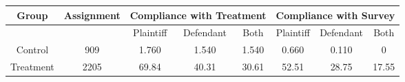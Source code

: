 \begin{tabular}{cccccccc} 
\toprule
\multicolumn{1}{c}{Group}  & \multicolumn{1}{c}{Assignment}  & \multicolumn{3}{c}{Compliance with Treatment}  & \multicolumn{3}{c}{Compliance with Survey}  \\
\midrule
\midrule
&   & Plaintiff & Defendant & Both & Plaintiff & Defendant & Both \\\cmidrule(r){3-5}\cmidrule(l){6-8}
Control & 909 & 1.760 & 1.540 & 1.540 & 0.660 & 0.110 & 0 \\ 
Treatment & 2205 & 69.84 & 40.31 & 30.61 & 52.51 & 28.75 & 17.55 \\ 
\bottomrule
\end{tabular} 
